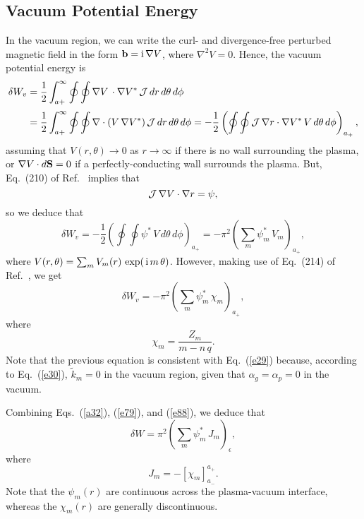 \documentclass[12pt,prb,aps]{revtex4-1}
\begin{document}
\subsection{Vacuum Potential Energy}
In the vacuum region, we can write the curl- and divergence-free perturbed magnetic field in the form 
${\bf b} = {\rm i}\,\nabla V$,
where
$\nabla^2 V =0$.
Hence, the vacuum potential energy is
\begin{align}
\delta W_v &= \frac{1}{2}\int_{a+}^\infty\oint\oint\nabla V\,\cdot\nabla V^\ast\,{\cal J}\,dr\,d\theta\,d\phi\nonumber\\[0.5ex]
&= \frac{1}{2}\int_{a+}^\infty\oint\oint  \nabla\cdot(V\,\nabla V^\ast)\,{\cal J}\,dr\,d\theta\,d\phi=-\frac{1}{2}\left(\oint\oint {\cal J}\,\nabla r\cdot\nabla V^\ast\,V\,d\theta\,d\phi\right)_{a_+},
\end{align}
assuming that $V(r,\theta)\rightarrow 0$ as $r\rightarrow \infty$ if there is no wall surrounding the plasma, or  $\nabla V\cdot d{\bf S}=0$ if a perfectly-conducting wall
surrounds the plasma. 
But, Eq.~(210) of Ref.~ implies that 
\begin{equation}
{\cal J}\,\nabla V\cdot\nabla r = \psi,
\end{equation}
so we deduce that
\begin{equation}\label{e87}
\delta W_v = -\frac{1}{2}\left(\oint\oint \psi^\ast\,V\,d\theta\,d\phi\right)_{a_{+}} =- \pi^2\left(\sum_m \psi_m^\ast\,V_m\right)_{a_{+}},
\end{equation}
where
$V(r,\theta)= \sum_m V_m(r)\,\exp(\,{\rm i}\,m\,\theta)$. 
However, making use of Eq.~(214) of Ref.~, we get
\begin{equation}\label{e88}
\delta W_v =-\pi^2\left(\sum_m\psi_m^\ast\,\chi_m\right)_{a_+},
\end{equation}
where
\begin{equation}\label{e89}
\chi_m=\frac{Z_m}{m-n\,q}.
 \end{equation}
 Note that the previous equation is consistent with Eq.~(\ref{e29}) because, according to Eq.~(\ref{e30}),  $\tilde{k}_m=0$ in the vacuum region, given that $\alpha_g=\alpha_p=0$ in the vacuum. 

Combining Eqs.~(\ref{a32}), (\ref{e79}),  and (\ref{e88}), we deduce that
\begin{equation}\label{e89a}
\delta W = \pi^2\left(\sum_m\psi_m^\ast\,J_m\right)_\epsilon,
\end{equation}
where
\begin{equation}\label{e90}
J_m= -\left[\chi_m\right]_{a_-}^{a_+}.
\end{equation}
Note that the $\psi_m(r)$ are continuous across the plasma-vacuum interface, whereas the $\chi_m(r)$ are generally discontinuous. 
\end{document}
